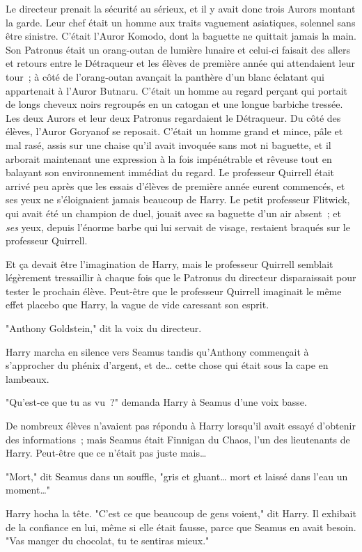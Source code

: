 Le directeur prenait la sécurité au sérieux, et il y avait donc trois Aurors montant la garde. Leur chef était un homme aux traits vaguement asiatiques, solennel sans être sinistre. C'était l'Auror Komodo, dont la baguette ne quittait jamais la main. Son Patronus était un orang-outan de lumière lunaire et celui-ci faisait des allers et retours entre le Détraqueur et les élèves de première année qui attendaient leur tour~; à côté de l'orang-outan avançait la panthère d'un blanc éclatant qui appartenait à l'Auror Butnaru. C'était un homme au regard perçant qui portait de longs cheveux noirs regroupés en un catogan et une longue barbiche tressée. Les deux Aurors et leur deux Patronus regardaient le Détraqueur. Du côté des élèves, l'Auror Goryanof se reposait. C'était un homme grand et mince, pâle et mal rasé, assis sur une chaise qu'il avait invoquée sans mot ni baguette, et il arborait maintenant une expression à la fois impénétrable et rêveuse tout en balayant son environnement immédiat du regard. Le professeur Quirrell était arrivé peu après que les essais d'élèves de première année eurent commencés, et ses yeux ne s'éloignaient jamais beaucoup de Harry. Le petit professeur Flitwick, qui avait été un champion de duel, jouait avec sa baguette d'un air absent~; et \emph{ses} yeux, depuis l'énorme barbe qui lui servait de visage, restaient braqués sur le professeur Quirrell.

Et ça devait être l'imagination de Harry, mais le professeur Quirrell semblait légèrement tressaillir à chaque fois que le Patronus du directeur disparaissait pour tester le prochain élève. Peut-être que le professeur Quirrell imaginait le même effet placebo que Harry, la vague de vide caressant son esprit.

"Anthony Goldstein," dit la voix du directeur.

Harry marcha en silence vers Seamus tandis qu'Anthony commençait à s'approcher du phénix d'argent, et de… cette chose qui était sous la cape en lambeaux.

"Qu'est-ce que tu as vu~?" demanda Harry à Seamus d'une voix basse.

De nombreux élèves n'avaient pas répondu à Harry lorsqu'il avait essayé d'obtenir des informations~; mais Seamus était Finnigan du Chaos, l'un des lieutenants de Harry. Peut-être que ce n'était pas juste mais…

"Mort," dit Seamus dans un souffle, "gris et gluant… mort et laissé dans l'eau un moment…"

Harry hocha la tête. "C'est ce que beaucoup de gens voient," dit Harry. Il exhibait de la confiance en lui, même si elle était fausse, parce que Seamus en avait besoin. "Vas manger du chocolat, tu te sentiras mieux."

